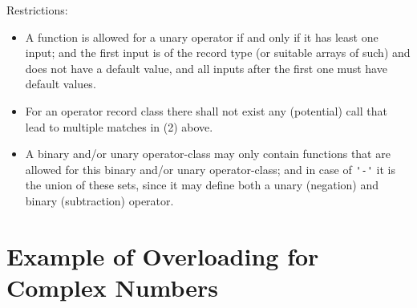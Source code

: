 Restrictions:
\begin{itemize}
\item
  A function is allowed for a unary operator if and only if it has least
  one input; and the first input is of the record type (or suitable
  arrays of such) and does not have a default value, and all inputs
  after the first one must have default values.
\item
  For an operator record class there shall not exist any
  (potential) call that lead to multiple matches in (2) above.
\item
  A binary and/or unary operator-class may only contain functions that
  are allowed for this binary and/or unary operator-class; and in case
  of \lstinline!'-'! it is the union of these sets, since it may define both a unary
  (negation) and binary (subtraction) operator.
\end{itemize}

\section{Example of Overloading for Complex Numbers}\label{example-of-overloading-for-complex-numbers}

